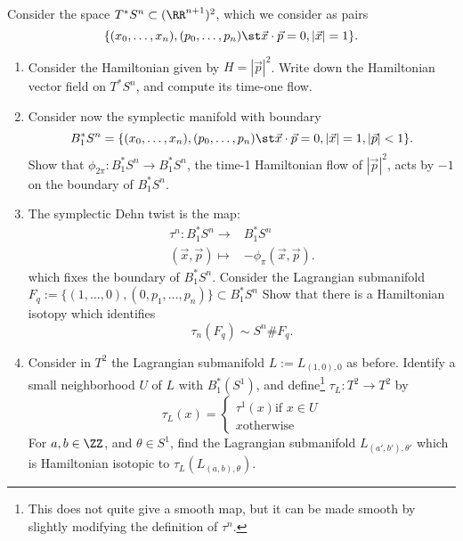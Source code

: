 
 
 
Consider the space $T^*S^n\subset (\RR^{n+1})^2$, which we consider as pairs \[\{(x_0, \ldots, x_n), (p_0, \ldots, p_n) \st\vec x\cdot \vec p=0, |\vec x|=1 \}.\] 
\begin{enumerate}
    \item Consider the Hamiltonian given by $H=|\vec p|^2$. Write down the Hamiltonian vector field on $T^*S^n$, and compute its time-one flow.
    \item Consider now the symplectic manifold with boundary 
    \[B^*_1S^n=\{(x_0, \ldots, x_n), (p_0, \ldots, p_n) \st\vec x\cdot \vec p =0,|\vec x|=1, |\vec p|<1\}.\]
    Show that $\phi_{2\pi}: B^*_1S^n\to B^*_1 S^n$, the time-1 Hamiltonian flow of $|\vec p|^2$, acts by  $-1$ on the boundary of $B^*_1S^n$. 
    \item The symplectic Dehn twist is the map: 
    \begin{align*}
        \tau^n: B^*_1 S^n\to& B^*_1 S^n\\
            (\vec x, \vec p) \mapsto& -\phi_{\pi}(\vec x, \vec p).
    \end{align*}
    which fixes the boundary of $B^*_1 S^n$.
    Consider the Lagrangian submanifold  $F_q:=\{(1, \ldots, 0), (0, p_1, \ldots, p_n)\}\subset B^*_1S^n$  Show that there is a Hamiltonian isotopy which identifies
    \[\tau_n(F_q)\sim S^n\# F_q.\]
    \item Consider in $T^2$ the Lagrangian submanifold $L:=L_{(1, 0),0}$ as before. Identify a small neighborhood $U$ of $L$ with $B^*_1(S^1)$, and define\footnote{This does not quite give a smooth map, but it can be made smooth by slightly modifying the definition of $\tau^n$.} $\tau_L: T^2\to T^2$ by 
    \[\tau_L(x)=\left\{\begin{array}{cc} \tau^1(x) \text{if $x\in U$}\\
        x \text{otherwise}\end{array}\right.\]
    For $a, b\in \ZZ$, and $\theta\in S^1$, find the Lagrangian submanifold $L_{(a', b'), \theta'}$ which is Hamiltonian isotopic to  $\tau_L(L_{(a, b), \theta})$.
\end{enumerate}

 